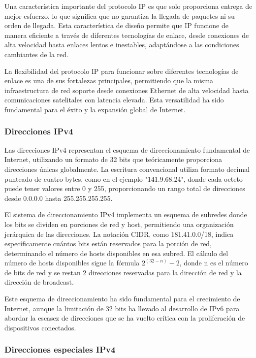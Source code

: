 Una característica importante del protocolo IP es que solo proporciona entrega de mejor esfuerzo, lo que significa que no garantiza la llegada de paquetes ni su orden de llegada. Esta característica de diseño permite que IP funcione de manera eficiente a través de diferentes tecnologías de enlace, desde conexiones de alta velocidad hasta enlaces lentos e inestables, adaptándose a las condiciones cambiantes de la red.

La flexibilidad del protocolo IP para funcionar sobre diferentes tecnologías de enlace es una de sus fortalezas principales, permitiendo que la misma infraestructura de red soporte desde conexiones Ethernet de alta velocidad hasta comunicaciones satelitales con latencia elevada. Esta versatilidad ha sido fundamental para el éxito y la expansión global de Internet.

\subsubsection{Direcciones IPv4}

Las direcciones IPv4 representan el esquema de direccionamiento fundamental de Internet, utilizando un formato de 32 bits que teóricamente proporciona direcciones únicas globalmente. La escritura convencional utiliza formato decimal punteado de cuatro bytes, como en el ejemplo "141.9.68.24", donde cada octeto puede tener valores entre 0 y 255, proporcionando un rango total de direcciones desde 0.0.0.0 hasta 255.255.255.255.

El sistema de direccionamiento IPv4 implementa un esquema de subredes donde los bits se dividen en porciones de red y host, permitiendo una organización jerárquica de las direcciones. La notación CIDR, como 181.41.0.0/18, indica específicamente cuántos bits están reservados para la porción de red, determinando el número de hosts disponibles en esa subred. El cálculo del número de hosts disponibles sigue la fórmula $2^{(32-n)} - 2$, donde n es el número de bits de red y se restan 2 direcciones reservadas para la dirección de red y la dirección de broadcast.

Este esquema de direccionamiento ha sido fundamental para el crecimiento de Internet, aunque la limitación de 32 bits ha llevado al desarrollo de IPv6 para abordar la escasez de direcciones que se ha vuelto crítica con la proliferación de dispositivos conectados.

\subsubsection{Direcciones especiales IPv4}

